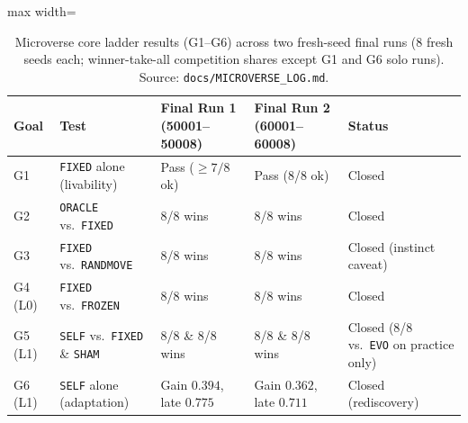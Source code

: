 \begin{table}[t]
\centering
\caption{Microverse core ladder results (G1--G6) across two fresh-seed final runs (8 fresh seeds each; winner-take-all competition shares except G1 and G6 solo runs). Source: \texttt{docs/MICROVERSE\_LOG.md}.}
\label{tab:g1-g6}
\small
\begin{adjustbox}{max width=\textwidth}
\begin{tabular}{@{}lllll@{}}
\toprule
\textbf{Goal} & \textbf{Test} & \textbf{Final Run 1 (50001--50008)} & \textbf{Final Run 2 (60001--60008)} & \textbf{Status} \\
\midrule
G1 & \texttt{FIXED} alone (livability) & Pass ($\ge 7/8$ ok) & Pass (8/8 ok) & Closed \\
G2 & \texttt{ORACLE} vs.\ \texttt{FIXED} & 8/8 wins & 8/8 wins & Closed \\
G3 & \texttt{FIXED} vs.\ \texttt{RANDMOVE} & 8/8 wins & 8/8 wins & Closed (instinct caveat) \\
G4 (L0) & \texttt{FIXED} vs.\ \texttt{FROZEN} & 8/8 wins & 8/8 wins & Closed \\
G5 (L1) & \texttt{SELF} vs.\ \texttt{FIXED} \& \texttt{SHAM} & 8/8 \& 8/8 wins & 8/8 \& 8/8 wins & Closed (8/8 vs.\ \texttt{EVO} on practice only) \\
G6 (L1) & \texttt{SELF} alone (adaptation) & Gain $0.394$, late $0.775$ & Gain $0.362$, late $0.711$ & Closed (rediscovery) \\
\bottomrule
\end{tabular}
\end{adjustbox}
\end{table}

